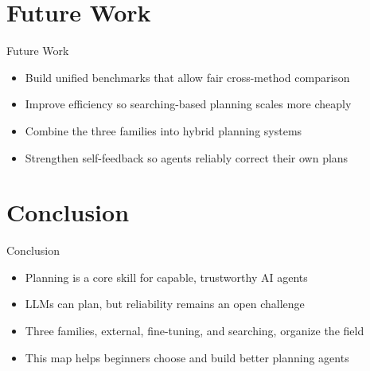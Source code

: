 \documentclass[10pt]{beamer}
\begin{document}
\section{Future Work}
\begin{frame}{Future Work}
\begin{itemize}
  \item Build unified benchmarks that allow fair cross-method comparison
  \item Improve efficiency so searching-based planning scales more cheaply
  \item Combine the three families into hybrid planning systems
  \item Strengthen self-feedback so agents reliably correct their own plans
\end{itemize}
\end{frame}
\section{Conclusion}
\begin{frame}{Conclusion}
\begin{itemize}
  \item Planning is a core skill for capable, trustworthy AI agents
  \item LLMs can plan, but reliability remains an open challenge
  \item Three families, external, fine-tuning, and searching, organize the field
  \item This map helps beginners choose and build better planning agents
\end{itemize}
\end{frame}
\end{document}
